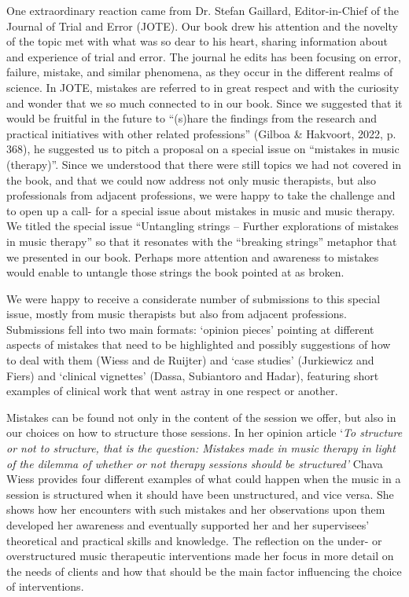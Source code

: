 \documentclass[authordate, empirical, issue]{jote-new-article}
\begin{document}
One extraordinary reaction came from Dr. Stefan Gaillard, Editor-in-Chief of the Journal of Trial and Error (JOTE). Our book drew his attention and the novelty of the topic met with what was so dear to his heart, sharing information about and experience of trial and error. The journal he edits has been focusing on error, failure, mistake, and similar phenomena, as they occur in the different realms of science. In JOTE, mistakes are referred to in great respect and with the curiosity and wonder that we so much connected to in our book. Since we suggested that it would be fruitful in the future to “(s)hare the findings from the research and practical initiatives with other related professions” (Gilboa \& Hakvoort, 2022, p. 368), he suggested us to pitch a proposal on a special issue on “mistakes in music (therapy)”. Since we understood that there were still topics we had not covered in the book, and that we could now address not only music therapists, but also professionals from adjacent professions, we were happy to take the challenge and to open up a call- for a special issue about mistakes in music and music therapy. We titled the special issue “Untangling strings -- Further explorations of mistakes in music therapy” so that it resonates with the “breaking strings” metaphor that we presented in our book. Perhaps more attention and awareness to mistakes would enable to untangle those strings the book pointed at as broken.



We were happy to receive a considerate number of submissions to this special issue, mostly from music therapists but also from adjacent professions. Submissions fell into two main formats: ‘opinion pieces' pointing at different aspects of mistakes that need to be highlighted and possibly suggestions of how to deal with them (Wiess and de Ruijter) and ‘case studies' (Jurkiewicz and Fiers) and ‘clinical vignettes' (Dassa, Subiantoro and Hadar), featuring short examples of clinical work that went astray in one respect or another.



Mistakes can be found not only in the content of the session we offer, but also in our choices on how to structure those sessions. In her opinion article ‘\emph{To structure or not to structure, that is the question: Mistakes made in music therapy in light of the dilemma of whether or not therapy sessions should be structured'} Chava Wiess provides four different examples of what could happen when the music in a session is structured when it should have been unstructured, and vice versa. She shows how her encounters with such mistakes and her observations upon them developed her awareness and eventually supported her and her supervisees' theoretical and practical skills and knowledge. The reflection on the under- or overstructured music therapeutic interventions made her focus in more detail on the needs of clients and how that should be the main factor influencing the choice of interventions.
\end{document}

